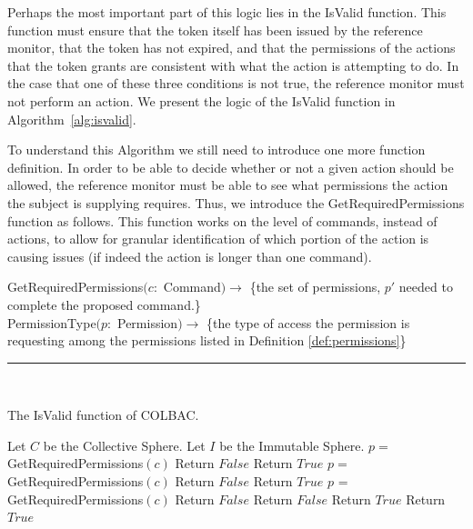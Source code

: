 Perhaps the most important part of this logic lies in the IsValid function. This
function must ensure that the token itself has been issued by the reference
monitor, that the token has not expired, and that the permissions of the actions
that the token grants are consistent with what the action is attempting to do.
In the case that one of these three conditions is not true, the reference
monitor must not perform an action. We present the logic of the IsValid function
in Algorithm~\ref{alg:isvalid}.

To understand this Algorithm we still need to introduce one more function
definition. In order to be able to decide whether or not a given action should
be allowed, the reference monitor must be able to see what permissions the
action the subject is supplying requires. Thus, we introduce the
GetRequiredPermissions function as follows. This function works on the level of
commands, instead of actions, to allow for granular identification of which
portion of the action is causing issues (if indeed the action is longer than one
command).

\begin{definition}
GetRequiredPermissions$(c:$ Command$) \rightarrow$ \{the set of permissions,
$p'$ needed to complete the proposed command.\}\\
PermissionType$(p:$ Permission$) \rightarrow $ \{the type of access the
permission is requesting among the permissions listed in Definition
\ref{def:permissions}\}\\
\hrule\mbox{}\\
\end{definition}

\begin{algorithm}
\caption{The IsValid function of COLBAC.}
\label{alg:isvalid}
\begin{algorithmic}[1]
\State Let $C$ be the Collective Sphere.
\State Let $I$ be the Immutable Sphere.
         
            \State $p =$ GetRequiredPermissions$(c)$
                \State Return $False$
            \EndIf
        \EndFor
        \State Return $True$
    \Else
        \State $p =$ GetRequiredPermissions$(c)$
            \State Return $False$
        \EndIf
        \State Return $True$
    \EndIf
{}
     
        \State $p$ = GetRequiredPermissions$(c)$
            \State Return $False$
                \State Return $False$
            \EndIf
            \State Return $True$
        \Else {}
            \State Return $True$
        \EndIf
    \EndFor
\EndIf
\EndProcedure
\end{algorithmic}
\end{algorithm}

